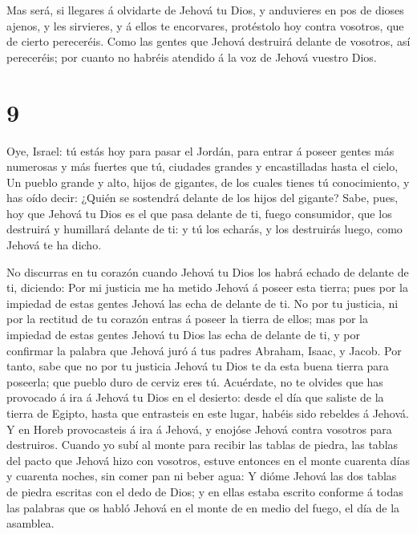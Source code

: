  Mas será, si llegares á olvidarte de Jehová tu Dios, y
anduvieres en pos de dioses ajenos, y les sirvieres, y á ellos te
encorvares, protéstolo hoy contra vosotros, que de cierto pereceréis.
 Como las gentes que Jehová destruirá delante de vosotros,
así pereceréis; por cuanto no habréis atendido á la voz de Jehová
vuestro Dios.

\hypertarget{section-8}{%
\section{9}\label{section-8}}

 Oye, Israel: tú estás hoy para pasar el Jordán, para entrar
á poseer gentes más numerosas y más fuertes que tú, ciudades grandes y
encastilladas hasta el cielo,  Un pueblo grande y alto,
hijos de gigantes, de los cuales tienes tú conocimiento, y has oído
decir: ¿Quién se sostendrá delante de los hijos del gigante?
 Sabe, pues, hoy que Jehová tu Dios es el que pasa delante
de ti, fuego consumidor, que los destruirá y humillará delante de ti: y
tú los echarás, y los destruirás luego, como Jehová te ha dicho.

 No discurras en tu corazón cuando Jehová tu Dios los habrá
echado de delante de ti, diciendo: Por mi justicia me ha metido Jehová á
poseer esta tierra; pues por la impiedad de estas gentes Jehová las echa
de delante de ti.  No por tu justicia, ni por la rectitud de
tu corazón entras á poseer la tierra de ellos; mas por la impiedad de
estas gentes Jehová tu Dios las echa de delante de ti, y por confirmar
la palabra que Jehová juró á tus padres Abraham, Isaac, y Jacob.
 Por tanto, sabe que no por tu justicia Jehová tu Dios te da
esta buena tierra para poseerla; que pueblo duro de cerviz eres tú.
 Acuérdate, no te olvides que has provocado á ira á Jehová
tu Dios en el desierto: desde el día que saliste de la tierra de Egipto,
hasta que entrasteis en este lugar, habéis sido rebeldes á Jehová.
 Y en Horeb provocasteis á ira á Jehová, y enojóse Jehová
contra vosotros para destruiros.  Cuando yo subí al monte
para recibir las tablas de piedra, las tablas del pacto que Jehová hizo
con vosotros, estuve entonces en el monte cuarenta días y cuarenta
noches, sin comer pan ni beber agua:  Y dióme Jehová las
dos tablas de piedra escritas con el dedo de Dios; y en ellas estaba
escrito conforme á todas las palabras que os habló Jehová en el monte de
en medio del fuego, el día de la asamblea.

